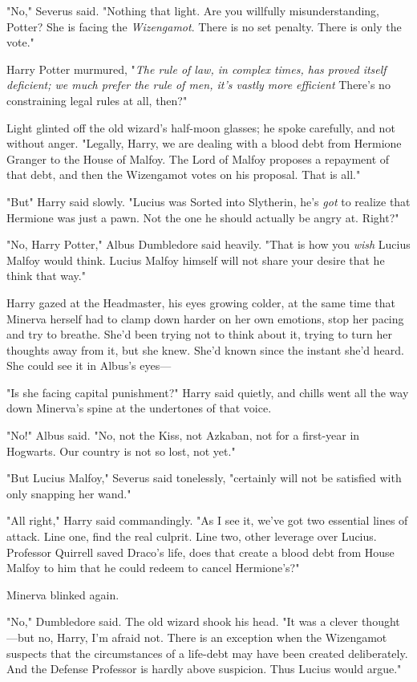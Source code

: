 "No," Severus said. "Nothing that light. Are you willfully misunderstanding,
Potter? She is facing the \emph{Wizengamot}. There is no set penalty. There is
only the vote."

Harry Potter murmured, "\emph{The rule of law, in complex times, has proved
itself deficient; we much prefer the rule of men, it's vastly more
efficient{\el}} There's no constraining legal rules at all, then?"

Light glinted off the old wizard's half-moon glasses; he spoke carefully, and
not without anger. "Legally, Harry, we are dealing with a blood debt from
Hermione Granger to the House of Malfoy. The Lord of Malfoy proposes a
repayment of that debt, and then the Wizengamot votes on his proposal. That is
all."

"But{\el}" Harry said slowly. "Lucius was Sorted into Slytherin, he's
\emph{got} to realize that Hermione was just a pawn. Not the one he should
actually be angry at. Right?"

"No, Harry Potter," Albus Dumbledore said heavily. "That is how you \emph{wish}
Lucius Malfoy would think. Lucius Malfoy himself{\el} will not share your
desire that he think that way."

Harry gazed at the Headmaster, his eyes growing colder, at the same time that
Minerva herself had to clamp down harder on her own emotions, stop her pacing
and try to breathe. She'd been trying not to think about it, trying to turn her
thoughts away from it, but she knew. She'd known since the instant she'd heard.
She could see it in Albus's eyes---

"Is she facing capital punishment?" Harry said quietly, and chills went all the
way down Minerva's spine at the undertones of that voice.

"No!" Albus said. "No, not the Kiss, not Azkaban, not for a first-year in
Hogwarts. Our country is not so lost, not yet."

"But Lucius Malfoy," Severus said tonelessly, "certainly will not be satisfied
with only snapping her wand."

"All right," Harry said commandingly. "As I see it, we've got two essential
lines of attack. Line one, find the real culprit. Line two, other leverage over
Lucius. Professor Quirrell saved Draco's life, does that create a blood debt
from House Malfoy to him that he could redeem to cancel Hermione's?"

Minerva blinked again.

"No," Dumbledore said. The old wizard shook his head. "It was a clever
thought---but no, Harry, I'm afraid not. There is an exception when the
Wizengamot suspects that the circumstances of a life-debt may have been created
deliberately. And the Defense Professor is hardly above suspicion. Thus Lucius
would argue."


